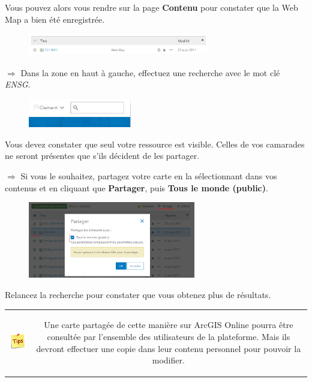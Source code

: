 \documentclass[11pt]{article}
\newcommand{\action}{$\Rightarrow$ }
\newenvironment{note}{%
	\begin{tabular}[t t]{c c}
		\includegraphics{img/tips.png}
		 &
		\begin{minipage}[c]{0.9\linewidth}
			\begin{sffamily}
}{%
			\end{sffamily}
		\end{minipage}
	\end{tabular}
}
\begin{document}
Vous pouvez alors vous rendre sur la page \textbf{Contenu} pour constater que la Web Map a bien été enregistrée.
\begin{figure}[H]
	\center \includegraphics[width=0.7\textwidth]{img/cours3/ago_web_map_ok.png} \\
\end{figure}

\action Dans la zone en haut à gauche, effectuez une recherche avec le mot clé \textit{ENSG}.
\begin{figure}[H]
	\center \includegraphics[width=0.4\textwidth]{img/cours3/ago_recherche.png} \\
\end{figure}

Vous devez constater que seul votre ressource est visible. Celles de vos camarades ne seront présentes que s'ils décident de les partager.

\action Si vous le souhaitez, partagez votre carte en la sélectionnant dans vos contenus et en cliquant que \textbf{Partager}, puis \textbf{Tous le monde (public)}.
\begin{figure}[H]
	\center \includegraphics[width=0.65\textwidth]{img/cours3/ago_partager_carte.png} \\
\end{figure}

Relancez la recherche pour constater que vous obtenez plus de résultats.

\begin{note}
Une carte partagée de cette manière sur ArcGIS Online pourra être consultée par l'ensemble des utilisateurs de la plateforme. Mais ils devront effectuer une copie dans leur contenu personnel pour pouvoir la modifier.
\end{note}
\end{document}
